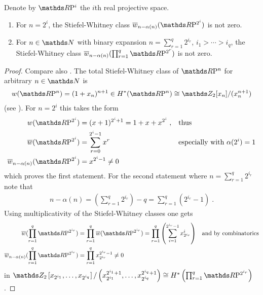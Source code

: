 \begin{Thm}
  Denote by $\RP{i}$ the $i$th real projective space.
  \begin{enumerate}
  \item For $n=2^i$, the Stiefel-Whitney class
    $\dualw{n-\alpha(n)}{\RP{2^i}}$ is not zero.
  \item For $n\in\Nat$ with binary expansion
    $n=\sum_{r=1}^{q}2^{i_r}$, $i_1>\dotsb>i_q$, the Stiefel-Whitney class
    $\dualw{n-\alpha(n)}{\prod_{r=1}^{q}\RP{2^r}}$ is not zero.
  \end{enumerate}
  \begin{proof}
    Compare also \cite[p.~87]{immersionconj}.
    The total Stiefel-Whitney class of $\RP{n}$ for arbitrary
    $n\in\Nat$ is
    \begin{gather*}
      \W{\RP n} = (1+x_n)^{n+1}\in\H^*(\RP n)\cong \Zmod2[x_n]/(x_n^{n+1})
    \end{gather*}
    (see \forexample \cite[Example~(19.4.1)]{tomdieck}).
    For $n=2^i$ this takes the form
    \begin{align*}
      \W{\RP{2^i}}
      &= (x+1)^{2^i+1}
      = 1 + x + x^{2^i}\;,
        &&\text{thus} \\
      \dualW{\RP{2^i}}
      &= \sum_{r=0}^{2^i-1} x^r\;
        &&\text{especially with $\alpha(2^i)=1$} \\
      \dualw{n-\alpha(n)}{\RP{2^i}}
      &= x^{2^i-1}\neq 0
    \end{align*}
    which proves the first statement.
    For the second statement where $n=\sum_{r=1}^q 2^{i_r}$ note that
    \begin{gather}\label{eq:bestresultproof1}
      n-\alpha(n)
      = \left( \sum_{r=1}^q 2^{i_r} \right) - q
      = \sum_{r=1}^q \left( 2^{i_r} - 1 \right)
      \;.
    \end{gather}
    Using multiplicativity %
    of the Stiefel-Whitney classes one gets
    \begin{align*}
      \dualW{\prod_{r=1}^q \RP{2^{i_r}}}
      &= \prod_{r=1}^q \dualW{\RP{2^{i_r}}}
        = \prod_{r=1}^q \left(\sum_{i=1}^{2^{i_r}-1} x_{2^{i_r}}^{i}\right)
        &\text{and by combinatorics} \\
      \dualw{n-\alpha(n)}{\prod_{r=1}^{q}\RP{2^{i_r}}}
      &= \prod_{r=1}^q x_{2^{i_r}}^{2^{i_r}-1}
        \neq 0
    \end{align*}
    in
    $\Zmod2\left[x_{2^{i_1}},\dotsc,x_{2^{i_q}}\right]/
    \left(x_{2^{i_1}}^{2^{i_1}+1},\dotsc,x_{2^{i_q}}^{2^{i_q}+1}\right)
    \cong \H^*\left(\prod_{r=1}^q \RP{2^{i_r}}\right)$.
  \end{proof}
\end{Thm}



